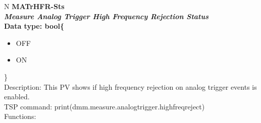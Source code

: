 \documentclass[openany]{article}
\begin{document}
		\begin{tabular}{N}
			\hline
			\bfseries MATrHFR-Sts\label{pv:matrhfr-sts} \\ \hline
			\emph{Measure Analog Trigger High Frequency Rejection Status} \\
			Data type: bool\{\begin{itemize}[noitemsep]
				\small
				\item[] OFF
				\item[] ON
			\end{itemize}\} \\
			Description: This PV shows if high frequency rejection on analog trigger events is enabled. \\
			TSP command: print(dmm.measure.analogtrigger.highfreqreject) \\
			Functions: \\
			\arrayrulecolor{\FuncTableBorderColor}

		\end{tabular}
\end{document}
